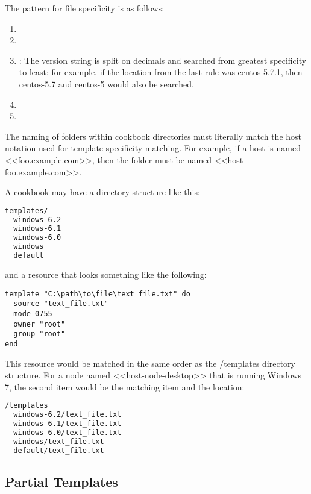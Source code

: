The pattern for file specificity is as follows:

\begin{enumerate}
  \item {}
  \item {}
  \item {}: The version string is split on decimals and searched from greatest specificity to least; for example, if the location from the last rule was centos-5.7.1, then centos-5.7 and centos-5 would also be searched.
  \item {}
  \item {}
\end{enumerate}

The naming of folders within cookbook directories must literally match the host notation used for template specificity matching. For example, if a host is named <<foo.example.com>>, then the folder must be named <<host-foo.example.com>>.

A cookbook may have a  directory structure like this:

\begin{lstlisting}[language=Bash,label=lst:cookbook-templates7]
templates/
  windows-6.2
  windows-6.1
  windows-6.0
  windows
  default
\end{lstlisting}

and a resource that looks something like the following:

\begin{lstlisting}[label=lst:cookbook-templates8]
template "C:\path\to\file\text_file.txt" do
  source "text_file.txt"
  mode 0755
  owner "root"
  group "root"
end
\end{lstlisting}

This resource would be matched in the same order as the /templates directory structure. For a node named <<host-node-desktop>> that is running Windows 7, the second item would be the matching item and the location:

\begin{lstlisting}[language=Bash,label=lst:cookbook-templates8]
/templates
  windows-6.2/text_file.txt
  windows-6.1/text_file.txt
  windows-6.0/text_file.txt
  windows/text_file.txt
  default/text_file.txt
\end{lstlisting}

\subsection{Partial Templates}

